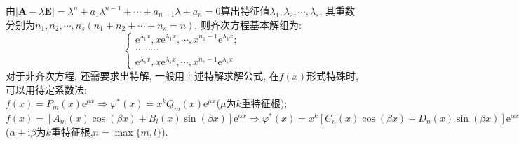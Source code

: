 \documentclass[titlepage,11pt,a4paper,twoside]{report}
\newcommand\e{\mathrm{e}}
\newcommand\ii{\mathrm{i}}
\begin{document}
由$|\bm{A}-\lambda\bm{E}|=\lambda^n+a_1\lambda^{n-1}+\cdots+a_{n-1}\lambda+a_n=0$算出特征值$\lambda_1,\lambda_2,\cdots,\lambda_s$, 其重数分别为$n_1,n_2,\cdots,n_s(n_1+n_2+\cdots+n_s=n)$, 则齐次方程基本解组为:
\[\begin{cases}
\e^{\lambda_1x},x\e^{\lambda_1x},\cdots,x^{n_1-1}\e^{\lambda_1x};\\
\cdots\cdots\cdots\\
\e^{\lambda_sx},x\e^{\lambda_sx},\cdots,x^{n_s-1}\e^{\lambda_sx}
\end{cases}\]
对于非齐次方程, 还需要求出特解, 一般用上述特解求解公式, 在$f(x)$形式特殊时, 可以用待定系数法:\\
$f(x)=P_m(x)\e^{\mu x}\Rightarrow\varphi^*(x)=x^kQ_m(x)\e^{\mu x}$($\mu$为$k$重特征根);\\
$f(x)=[A_m(x)\cos(\beta x)+B_l(x)\sin(\beta x)]\e^{\alpha x}\Rightarrow\varphi^*(x)=x^k[C_n(x)\cos(\beta x)+D_n(x)\sin(\beta x)]\e^{\alpha x}$($\alpha\pm\ii\beta$为$k$重特征根,$n=\max\{m,l\}$).
\end{document}
